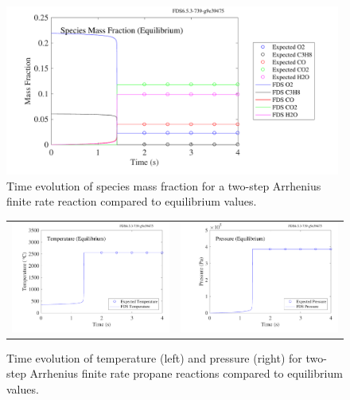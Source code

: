 \documentclass[11pt]{book}
\begin{document}
\begin{figure}[h!]
\begin{center}
\includegraphics[height=2.2in]{SCRIPT_FIGURES/reactionrate_equilibrium_species}
\end{center}
\caption[Species evolution in an equilibrium case]{Time evolution of species mass fraction for a two-step Arrhenius finite rate reaction compared to equilibrium values.}
\label{fig:Arrhenius_2Order_1stepb}
\end{figure}

\begin{figure}[ht]
\begin{tabular*}{\textwidth}{lr}
\includegraphics[width=3.2in]{SCRIPT_FIGURES/reactionrate_equilibrium_temperature} &
\includegraphics[width=3.2in]{SCRIPT_FIGURES/reactionrate_equilibrium_pressure}
\end{tabular*}
\caption[Temperature and pressure evolution for equilibrium case]{Time evolution of temperature (left) and pressure (right) for two-step Arrhenius finite rate propane reactions compared to equilibrium values.}
\label{fig:Arrhenius_175Order_23stepb}
\end{figure}
\end{document}
